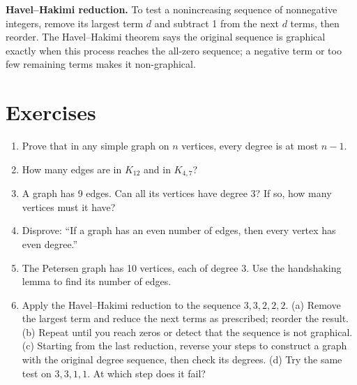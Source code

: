 \Enrichment{} \textbf{Havel--Hakimi reduction.} To test a nonincreasing sequence of nonnegative integers, remove its largest term $d$ and subtract 1 from the next $d$ terms, then reorder. The Havel--Hakimi theorem says the original sequence is graphical exactly when this process reaches the all-zero sequence; a negative term or too few remaining terms makes it non-graphical.

\section*{Exercises}
\begin{enumerate}
\item Prove that in any simple graph on $n$ vertices, every degree is at most $n-1$.
\item How many edges are in $K_{12}$ and in $K_{4,7}$?
\item A graph has 9 edges. Can all its vertices have degree 3? If so, how many vertices must it have?
\item Disprove: ``If a graph has an even number of edges, then every vertex has even degree.''
\item \Challenge{} The Petersen graph has 10 vertices, each of degree 3. Use the handshaking lemma to find its number of edges.
\item \Enrichment{} Apply the Havel--Hakimi reduction to the sequence $3,3,2,2,2$. (a) Remove the largest term and reduce the next terms as prescribed; reorder the result. (b) Repeat until you reach zeros or detect that the sequence is not graphical. (c) Starting from the last reduction, reverse your steps to construct a graph with the original degree sequence, then check its degrees. (d) Try the same test on $3,3,1,1$. At which step does it fail?
\end{enumerate}
